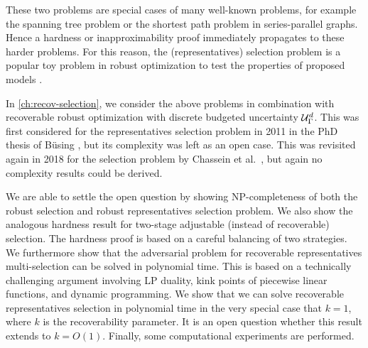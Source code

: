 These two problems are special cases of many well-known problems, for example the spanning tree problem or the shortest path problem in series-parallel graphs. Hence a hardness or inapproximability proof immediately propagates to these harder problems. For this reason, the (representatives) selection problem is a popular toy problem in robust optimization to test the properties of proposed models \cite{kasperski2015approximability,averbakh2001complexity,conde2004improved,dolgui2012min,deineko2013complexity,goerigk2019robust} 
.

In \cref{ch:recov-selection}, we consider the above problems in combination with recoverable robust optimization with discrete budgeted uncertainty $\mathcal{U}^d_\Gamma$. 
This was first considered for the representatives selection problem in 2011 in the PhD thesis of Büsing \cite{busing2011phd}, but its complexity was left as an open case. 
This was revisited again in 2018 for the selection problem by Chassein et al.\ \cite{chassein2018recoverable}, but again no complexity results could be derived. 

We are able to settle the open question by showing NP-completeness of both the robust selection and robust representatives selection problem. We also show the  analogous hardness result for two-stage adjustable (instead of recoverable) selection.
The hardness proof is based on a careful balancing of two strategies. We furthermore show that the adversarial problem for recoverable representatives multi-selection can be solved in polynomial time. This is based on a technically challenging argument involving LP duality, kink points of piecewise linear functions, and dynamic programming.
We show that we can solve recoverable representatives selection in polynomial time in the very special case that $k=1$, where $k$ is the recoverability parameter. It is an open question whether this result extends to $k = O(1)$. Finally, some computational experiments are performed.
 
